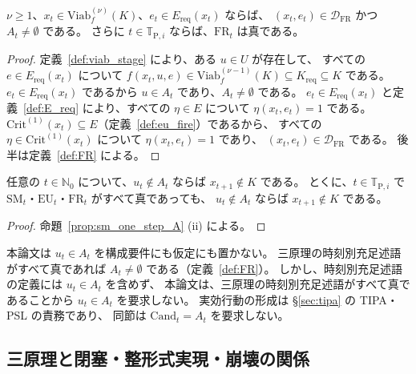 \begin{proposition}[有限段頑健可行集合と局所 FR]
\label{prop:viab_stage_fr}
$\nu\ge1$、$x_t\in\mathrm{Viab}_f^{(\nu)}(K)$、$e_t\in E_{\mathrm{req}}(x_t)$ ならば、
$(x_t,e_t)\in\mathcal{D}_{\mathrm{FR}}$ かつ $A_t\neq\emptyset$ である。
さらに $t\in\mathbb{T}_{\mathrm{P},i}$ ならば、$\mathrm{FR}_t$ は真である。
\end{proposition}

\begin{proof}
定義~\ref{def:viab_stage} により、ある $u\in U$ が存在して、
すべての $e\in E_{\mathrm{req}}(x_t)$ について
$f(x_t,u,e)\in\mathrm{Viab}_f^{(\nu-1)}(K)\subseteq K_{\mathrm{req}}\subseteq K$ である。
$e_t\in E_{\mathrm{req}}(x_t)$ であるから $u\in A_t$ であり、$A_t\neq\emptyset$ である。
$e_t\in E_{\mathrm{req}}(x_t)$ と定義~\ref{def:E_req} により、すべての $\eta\in E$ について $\eta(x_t,e_t)=1$ である。
$\mathrm{Crit}^{(1)}(x_t)\subseteq E$（定義~\ref{def:eu_fire}）であるから、
すべての $\eta\in\mathrm{Crit}^{(1)}(x_t)$ について $\eta(x_t,e_t)=1$ であり、
$(x_t,e_t)\in\mathcal{D}_{\mathrm{FR}}$ である。
後半は定義~\ref{def:FR} による。
\end{proof}

\begin{proposition}[選択の責務]
\label{prop:selection_responsibility}
任意の $t\in\mathbb{N}_0$ について、$u_t\notin A_t$ ならば $x_{t+1}\notin K$ である。
とくに、$t\in\mathbb{T}_{\mathrm{P},i}$ で $\mathrm{SM}_t$・$\mathrm{EU}_t$・$\mathrm{FR}_t$ がすべて真であっても、
$u_t\notin A_t$ ならば $x_{t+1}\notin K$ である。
\end{proposition}

\begin{proof}
命題~\ref{prop:sm_one_step_A} (ii) による。
\end{proof}

\begin{remark}[選択の責務と構成要件]
\label{rem:selection_responsibility}
本論文は $u_t\in A_t$ を構成要件にも仮定にも置かない。
三原理の時刻別充足述語がすべて真であれば $A_t\neq\emptyset$ である（定義~\ref{def:FR}）。
しかし、時刻別充足述語の定義には $u_t\in A_t$ を含めず、
本論文は、三原理の時刻別充足述語がすべて真であることから $u_t\in A_t$ を要求しない。
実効行動の形成は \S\ref{sec:tipa} の TIPA・PSL の責務であり、
同節は $\mathrm{Cand}_t=A_t$ を要求しない。
\end{remark}

\subsection{三原理と閉塞・整形式実現・崩壊の関係}
\label{subsec:principle_failure_relation}

